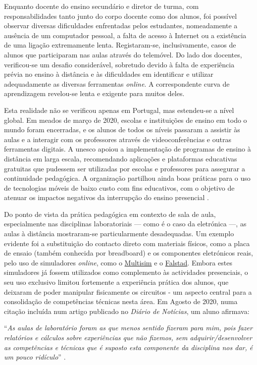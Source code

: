 Enquanto docente do ensino secundário e diretor de turma, com responsabilidades tanto junto do corpo docente como dos alunos, foi possível observar diversas dificuldades enfrentadas pelos estudantes, nomeadamente a ausência de um computador pessoal, a falta de acesso à Internet ou a existência de uma ligação extremamente lenta. Registaram-se, inclusivamente, casos de alunos que participaram nas aulas através do telemóvel. Do lado dos docentes, verificou-se um desafio considerável, sobretudo devido à falta de experiência prévia no ensino à distância e às dificuldades em identificar e utilizar adequadamente as diversas ferramentas \textit{online}. A correspondente curva de aprendizagem revelou-se lenta e exigente para muitos deles.

Esta realidade não se verificou apenas em Portugal, mas estendeu-se a nível global. Em meados de março de 2020, escolas e instituições de ensino em todo o mundo foram encerradas, e os alunos de todos os níveis passaram a assistir às aulas e a interagir com os professores através de videoconferências e outras ferramentas digitais. A \acrfull{unesco} apoiou a implementação de programas de ensino à distância em larga escala, recomendando aplicações e plataformas educativas gratuitas que pudessem ser utilizadas por escolas e professores para assegurar a continuidade pedagógica. A organização partilhou ainda boas práticas para o uso de tecnologias móveis de baixo custo com fins educativos, com o objetivo de atenuar os impactos negativos da interrupção do ensino presencial \cite{unesco}.

Do ponto de vista da prática pedagógica em contexto de sala de aula, especialmente nas disciplinas laboratoriais — como é o caso da eletrónica —, as aulas à distância mostraram-se particularmente desadequadas. Um exemplo evidente foi a substituição do contacto direto com materiais físicos, como a placa de ensaio (também conhecida por breadboard) e os componentes eletrónicos reais, pelo uso de simuladores \textit{online}, como o \href{https://www.multisim.com/}{Multisim} e o \href{https://www.falstad.com/circuit/}{Falstad}. Embora estes simuladores já fossem utilizados como complemento às actividades presenciais, o seu uso exclusivo limitou fortemente a experiência prática dos alunos, que deixaram de poder manipular fisicamente os circuitos - um aspecto central para a consolidação de competências técnicas nesta área. Em Agosto de 2020, numa citação incluída num artigo publicado no \textit{Diário de Notícias}, um aluno afirmava:
\begin{center}
    ``\textit{As aulas de laboratório foram as que menos sentido fizeram para mim, pois fazer relatórios e cálculos sobre experiências que não fizemos, sem adquirir/desenvolver as competências e técnicas que é suposto esta componente da disciplina nos dar, é um pouco ridículo}'' \cite{impactonegativocovid}.
\end{center}

